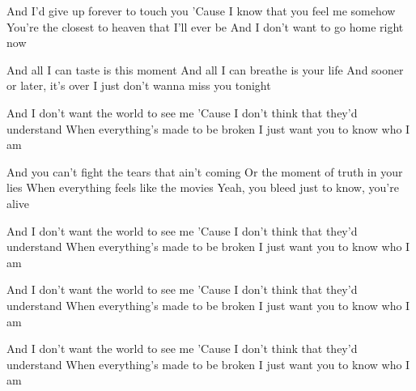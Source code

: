 \begin{verse*}
And I'd give up forever to touch you
'Cause I know that you feel me somehow
You're the closest to heaven that I'll ever be
And I don't want to go home right now
\end{verse*}

\begin{verse*}
And all I can taste is this moment
And all I can breathe is your life
And sooner or later, it's over
I just don't wanna miss you tonight
\end{verse*}

\begin{verse*}
And I don't want the world to see me
'Cause I don't think that they'd understand
When everything's made to be broken
I just want you to know who I am
\end{verse*}

\begin{verse*}
And you can't fight the tears that ain't coming
Or the moment of truth in your lies
When everything feels like the movies
Yeah, you bleed just to know, you're alive
\end{verse*}

\begin{verse*}
And I don't want the world to see me
'Cause I don't think that they'd understand
When everything's made to be broken
I just want you to know who I am
\end{verse*}

\begin{verse*}
And I don't want the world to see me
'Cause I don't think that they'd understand
When everything's made to be broken
I just want you to know who I am
\end{verse*}

\begin{verse*}
And I don't want the world to see me
'Cause I don't think that they'd understand
When everything's made to be broken
I just want you to know who I am 
\end{verse*}
